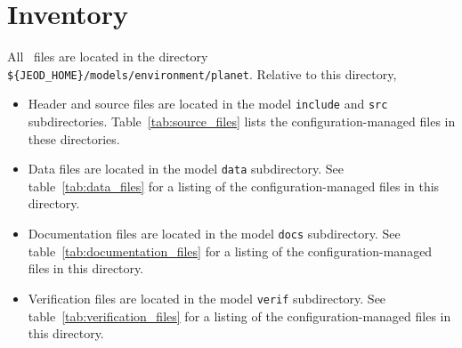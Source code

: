 %
%
% 


\section{Inventory}
All \planetDesc\ files are located in the directory \newline
{\tt \$\{JEOD\_HOME\}/models/environment/planet}.
Relative to this directory,
\begin{itemize}
\vspace{-0.2\baselineskip}
\item Header and source files are located
in the model {\tt include} and {\tt src} subdirectories.
Table~\ref{tab:source_files} lists the
configuration-managed files in these directories.
\vspace{-0.1\baselineskip}
\item Data files are located in the model {\tt data} subdirectory.
See table~\ref{tab:data_files}
for a listing of the
configuration-managed files in this directory.
\vspace{-0.1\baselineskip}
\item Documentation files are located in the model {\tt docs} subdirectory.
See table~\ref{tab:documentation_files}
for a listing of the
configuration-managed files in this directory.
\vspace{-0.1\baselineskip}
\item Verification files are located in the model {\tt verif} subdirectory.
See table~\ref{tab:verification_files}
for a listing of the
configuration-managed files in this directory.
\end{itemize}


